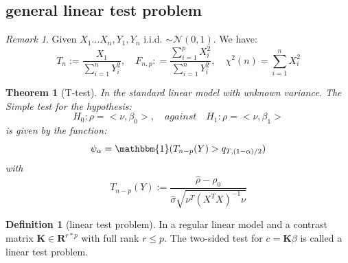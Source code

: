 \documentclass[a4paper,12pt, oneside, fleqn]{book}
\newtheorem{theorem}{Theorem}[section]
\theoremstyle{definition}
\newtheorem{definition}{Definition}[section]
\theoremstyle{remark}
\newtheorem*{remark}{Remark}
\begin{document}
\subsection{general linear test problem}
\begin{remark}
    Given $X_{1} \dots X_{n}, Y_{1}, Y_{n}$ i.i.d. $\sim \mathcal{N}(0, 1)$. We have:
    \begin{equation}
        T_n := \frac{X_1}{\sum_{i = 1}^{n} Y_i^2}, \quad
        F_{n, p}: = \frac{\sum_{i = 1}^p X_i^2}{\sum_{i = 1}^n Y_i^2}, \quad
        \chi^2(n) = \sum_{i = 1}^{n}X_i^2
    \end{equation}
\end{remark}

\begin{theorem}[T-test]
In the standard linear model with unknown variance. The Simple test for the hypothesis:
\begin{equation*}
    H_0: \rho = <\nu, \beta_0>, \quad against \quad H_1: \rho = <\nu, \beta_1>
\end{equation*}
is given by the function:
\begin{equation}
    \psi_\alpha = \mathbbm{1}(T_{n - p}(Y) > q_{T, (1 - \alpha)/2})
\end{equation}
with 
\begin{equation}
    T_{n - p}(Y) := \frac{\hat{\rho} - \rho_0}{\hat{\sigma} \sqrt{\nu^T (X^T X)^{-1} \nu}}
\end{equation}
\end{theorem}

\begin{definition}[linear test problem]
In a regular linear model and a contrast matrix $ \mathbf{K} \in \mathbf{R}^{r * p}$ with full rank $r \leq p$. The two-sided test for $c = \mathbf{K} \beta$ is called a linear test problem.
\end{definition}
\end{document}

